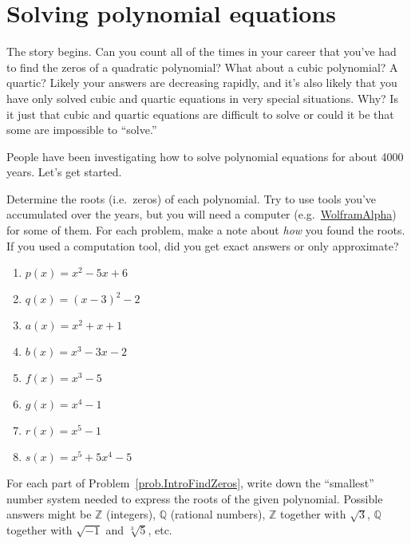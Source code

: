 \chapter{Solving polynomial equations}
\label{chapter:PolyEquations}
\thispagestyle{empty}

The story begins. Can you count all of the times in your career that you've had to find the zeros of a quadratic polynomial? What about a cubic polynomial? A quartic? Likely your answers are decreasing rapidly, and it's also likely that you have only solved cubic and quartic equations in very special situations. Why? Is it just that cubic and quartic equations are difficult to solve or could it be that some are impossible to ``solve.'' 

People have been investigating how to solve polynomial equations for about 4000 years. Let's get started.

\begin{problem}\label{prob.IntroFindZeros}
Determine the roots (i.e.~zeros) of each polynomial. Try to use tools you've accumulated over the years, but you will need a computer  (e.g.~\href{https://www.wolframalpha.com}{WolframAlpha}) for some of them. For each problem, make a note about \emph{how} you found the roots. If you used a computation tool, did you get exact answers or only approximate?
\begin{multicols}{2}
\begin{enumerate}
\item $p(x) = x^2 - 5x + 6$
\item $q(x) = (x-3)^2 - 2$
\item $a(x) = x^2 + x + 1$
\item $b(x) = x^3-3x-2$ %
\item $f(x) = x^3 - 5$
\item $g(x) = x^4 - 1$
\item $r(x) = x^5 - 1$
\item $s(x) = x^5 +5 x^4-5$
\end{enumerate}
\end{multicols}
\end{problem}

\begin{problem}\label{prob.IntroFindZerosWhere}
For each part of Problem~\ref{prob.IntroFindZeros}, write down the ``smallest'' number system needed to express the roots of the given polynomial. Possible answers might be $\mathbb{Z}$ (integers), $\mathbb{Q}$ (rational numbers), $\mathbb{Z}$ together with $\sqrt{3}$, $\mathbb{Q}$ together with $\sqrt{-1}$ and $\sqrt[3]{5}$, etc.
\end{problem}

